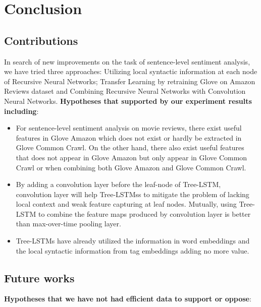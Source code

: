 \hypertarget{chap:conclude}{\chapter{Conclusion}}\label{conclusion}
\section{Contributions}
In search of new improvements on the task of sentence-level sentiment analysis, we have tried three approaches: Utilizing local syntactic information at each node of Recursive Neural Networks; Transfer Learning by retraining Glove on Amazon Reviews dataset and Combining Recursive Neural Networks with Convolution Neural Networks.
\textbf{Hypotheses that supported by our experiment results including}:
\begin{itemize}

\item For sentence-level sentiment analysis on movie reviews, there exist useful features in Glove Amazon which does not exist or hardly be extracted in Glove Common Crawl.
On the other hand, there also exist useful features that does not appear in Glove Amazon but only appear in Glove Common Crawl or when combining both Glove Amazon and Glove Common Crawl.

\item By adding a convolution layer before the leaf-node of Tree-LSTM, convolution layer will help Tree-LSTMss to mitigate the problem of lacking local context and weak feature capturing at leaf nodes.
Mutually, using Tree-LSTM to combine the feature maps produced by convolution layer is better than max-over-time pooling layer.

\item  Tree-LSTMs have already utilized the information in word embeddings and the local syntactic information from tag embeddings adding no more value. 
\end{itemize}

\section{Future works}
\label{unproved-hypo}
\textbf{Hypotheses that we have not had efficient data to support or oppose}:

